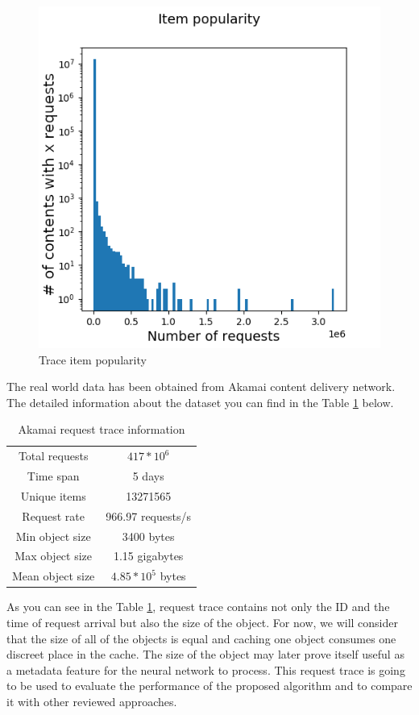 \begin{figure}[b!]
	\centering
	\includegraphics[totalheight=6cm]{pics/real_item_pop.png}
	\caption{Trace item popularity}
	\label{fig:pop_1}
\end{figure}

The real world data has been obtained from Akamai content delivery network\cite{12}. The detailed information about the dataset you can find in the Table \ref{table:1} below.

\begin{table}[h!]
	\centering
	\begin{tabular}{| c | c |}
		\hline 
		Total requests & $ 417 * 10^6 $ \\ 
		Time span & 5 days \\
		Unique items & 13271565 \\
		Request rate & 966.97 requests/s \\
		Min object size & 3400 bytes \\
		Max object size & 1.15 gigabytes \\ 
		Mean object size & $ 4.85 * 10^5 $ bytes \\
		\hline
	\end{tabular}
	\caption{Akamai request trace information}
	\label{table:1}
\end{table}

As you can see in the Table \ref{table:1}, request trace contains not only the ID and the time of request arrival but also the size of the object. For now, we will consider that the size of all of the objects is equal and caching one object consumes one discreet place in the cache. The size of the object may later prove itself useful as a metadata feature for the neural network to process. This request trace is going to be used to evaluate the performance of the proposed algorithm and to compare it with other reviewed approaches.

